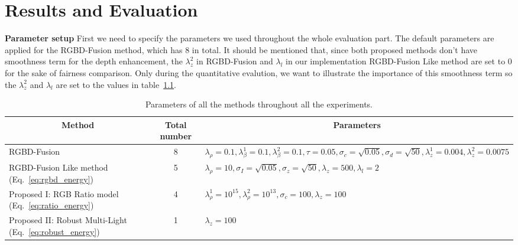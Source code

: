 \chapter{Results and Evaluation} \label{chap:result}
\textbf{Parameter setup}
First we need to specify the parameters we used throughout the whole evaluation part. 
The default parameters are applied for the RGBD-Fusion method, which has 8 in total. 
It should be mentioned that, since both proposed methods don't have smoothness term for the depth enhancement, the $\lambda_z^2$ in RGBD-Fusion and $\lambda_l$ in our implementation RGBD-Fusion Like method are set to 0 for the sake of fairness comparison.
Only during the quantitative evalution, we want to illustrate the importance of this smoothness term so the $\lambda_z^2$ and $\lambda_l$ are set to the values in table~\ref{tab:parameter_setup}.
\begin{table}[!ht]
\caption{Parameters of all the methods throughout all the experiments.}
\label{tab:parameter_setup}
\centering
\begin{tabular}{|m{4cm} |m{1.5cm} |m{7cm}|}
\hline
\multicolumn{1}{|c|}{Method}                               & \multicolumn{1}{c|}{Total number} & \multicolumn{1}{c|}{Parameters}                                                                                                                                          \\ \hline
RGBD-Fusion~\cite{or2015rgbd} & \multicolumn{1}{c|}{8}            &{$\lambda_\rho = 0.1, \lambda_\beta^1 = 0.1, \lambda_\beta^2 = 0.1, \tau = 0.05, \sigma_c = \sqrt{0.05}, \sigma_d = \sqrt{50}, \lambda_z^1 = 0.004, \lambda_z^2 = 0.0075$} \\ \hline
RGBD-Fusion Like method (Eq.~\ref{eq:rgbd_energy})                    & \multicolumn{1}{c|}{5}             & {$\lambda_{\rho} = 10, \sigma_I = \sqrt{0.05}, \sigma_z = \sqrt{50}, \lambda_z = 500, \lambda_l = 2$}                                                                                                                                                                         \\ \hline
Proposed I: RGB Ratio model (Eq.~\ref{eq:ratio_energy})                            & \multicolumn{1}{c|}{4}             & $\lambda_{\rho}^1 = 10^{15}, \lambda_{\rho}^2 = 10^{13}, \sigma_c = 100, \lambda_z = 100$                                                                                                                                                                                                                                                                                                                                                  \\ \hline
Proposed II: Robust Multi-Light  (Eq.~\ref{eq:robust_energy})                        & \multicolumn{1}{c|}{1}            & $\lambda_z = 100$                                                                                                                                                                          \\ \hline
\end{tabular}
\end{table}

